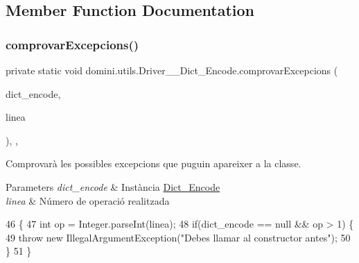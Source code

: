 \subsection{Member Function Documentation}
\mbox{\label{classdomini_1_1utils_1_1Driver____Dict__Encode_ab67e87f26a75c12e50130a5e5facb52e}} 
\subsubsection{\texorpdfstring{comprovar\+Excepcions()}{comprovarExcepcions()}}
{\footnotesize\ttfamily private static void domini.\+utils.\+Driver\+\_\+\+\_\+\+Dict\+\_\+\+Encode.\+comprovar\+Excepcions (\begin{DoxyParamCaption}\item[{\hyperlink{classdomini_1_1utils_1_1Dict__Encode}{Dict\+\_\+\+Encode}}]{dict\+\_\+encode,  }\item[{String}]{linea }\end{DoxyParamCaption})\hspace{0.3cm}{\ttfamily [inline]}, {\ttfamily [static]}, {\ttfamily [private]}}



Comprovarà les possibles excepcions que puguin apareixer a la classe. 


\begin{DoxyParams}{Parameters}
{\em dict\+\_\+encode} & Instància \hyperlink{classdomini_1_1utils_1_1Dict__Encode}{Dict\+\_\+\+Encode} \\
\hline
{\em linea} & Número de operació realitzada \\
\hline
\end{DoxyParams}

\begin{DoxyCode}
46                                                                                   \{
47         \textcolor{keywordtype}{int} op = Integer.parseInt(linea);
48         \textcolor{keywordflow}{if}(dict\_encode == null && op > 1) \{
49             \textcolor{keywordflow}{throw} \textcolor{keyword}{new} IllegalArgumentException(\textcolor{stringliteral}{"Debes llamar al constructor antes"});
50         \}
51     \}
\end{DoxyCode}
\mbox{\label{classdomini_1_1utils_1_1Driver____Dict__Encode_a67a9ab54d3335c433791b823d192ac8f}} 
